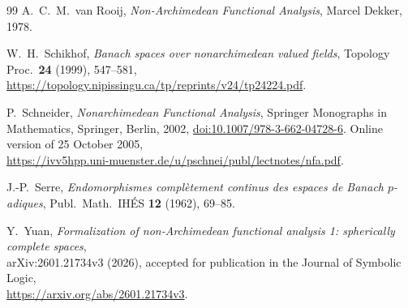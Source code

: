 \documentclass[11pt]{amsart}
\theoremstyle{definition}
\theoremstyle{remark}
\numberwithin{equation}{section}
\theoremstyle{plain}
\theoremstyle{definition}
\theoremstyle{plain}
\begin{document}
\begin{thebibliography}{99}
 A.~C.~M.~van Rooij, \emph{Non-Archimedean Functional Analysis}, Marcel Dekker, 1978.

 W.~H.~Schikhof, \emph{Banach spaces over nonarchimedean valued fields}, Topology Proc.\
\textbf{24} (1999), 547--581,\\
{\small\url{https://topology.nipissingu.ca/tp/reprints/v24/tp24224.pdf}}.

 P.~Schneider, \emph{Nonarchimedean Functional Analysis}, Springer Monographs in Mathematics,
Springer, Berlin, 2002, \href{https://doi.org/10.1007/978-3-662-04728-6}{doi:10.1007/978-3-662-04728-6}.
Online version of 25 October 2005,\\
{\small\url{https://ivv5hpp.uni-muenster.de/u/pschnei/publ/lectnotes/nfa.pdf}}.

 J.-P.~Serre, \emph{Endomorphismes compl\`etement continus des espaces de Banach $p$\nobreakdash-adiques}, Publ.\ Math.\
IH\'ES \textbf{12} (1962), 69--85.

 Y.~Yuan, \emph{Formalization of non-Archimedean functional analysis 1: spherically complete spaces},\\
arXiv:2601.21734v3 (2026), accepted for publication in the Journal of Symbolic Logic,\\
{\small\url{https://arxiv.org/abs/2601.21734v3}}.

\end{thebibliography}
\end{document}
